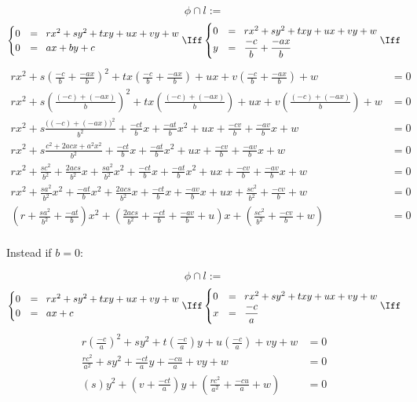 \documentclass[11pt,a4paper,english]{article}
\begin{document}
    \[
    \phi \cap l :=
    \]
    \[
    \begin{cases}
    	0 &=\;\; rx^{2} + sy^{2} + txy + ux + vy + w \\
		0 &=\;\; ax + by + c
    \end{cases} \Iff
    \begin{cases}
    	0 &=\;\; rx^{2} + sy^{2} + txy + ux + vy + w \\
		y &=\;\; \displaystyle\frac{-c}{b} + \displaystyle\frac{-ax}{b}
    \end{cases} \Iff
    \]
    \begin{align*}
    rx^{2} + s\left(\frac{-c}{b} + \frac{-ax}{b}\right)^{2} + tx\left(\frac{-c}{b} + \frac{-ax}{b}\right) + ux + v\left(\frac{-c}{b} + \frac{-ax}{b}\right) + w &= 0
    \\
	rx^{2} + s\left(\frac{(-c) + (-ax)}{b}\right)^{2} + tx\left(\frac{(-c) + (-ax)}{b}\right) + ux + v\left(\frac{(-c) + (-ax)}{b}\right) + w &= 0
	\\
	rx^{2} + s\frac{\big((-c) + (-ax)\big)^{2}}{b^{2}} + \frac{-ct}{b}x + \frac{-at}{b}x^{2} + ux + \frac{-cv}{b} + \frac{-av}{b}x + w &= 0
	\\
	rx^{2} + s\frac{c^{2} + 2acx + a^{2}x^{2}}{b^{2}} + \frac{-ct}{b}x + \frac{-at}{b}x^{2} + ux + \frac{-cv}{b} + \frac{-av}{b}x + w &= 0
	\\
	rx^{2} + \frac{sc^{2}}{b^{2}} + \frac{2acs}{b^{2}}x + \frac{sa^{2}}{b^{2}}x^{2} + \frac{-ct}{b}x + \frac{-at}{b}x^{2} + ux + \frac{-cv}{b} + \frac{-av}{b}x + w &= 0
	\\
	rx^{2} + \frac{sa^{2}}{b^{2}}x^{2} + \frac{-at}{b}x^{2} + \frac{2acs}{b^{2}}x + \frac{-ct}{b}x + \frac{-av}{b}x + ux + \frac{sc^{2}}{b^{2}} + \frac{-cv}{b} + w &= 0
	\\
	\left(r + \frac{sa^{2}}{b^{2}} + \frac{-at}{b}\right)x^{2} + \left(\frac{2acs}{b^{2}} + \frac{-ct}{b} + \frac{-av}{b} + u\right)x + \left(\frac{sc^{2}}{b^{2}} + \frac{-cv}{b} + w\right) &= 0
	\\
    \end{align*}
    
    \ppar
    Instead if \(b = 0\):
    
    \[
    \phi \cap l :=
    \]
    \[
    \begin{cases}
    	0 &=\;\; rx^{2} + sy^{2} + txy + ux + vy + w \\
		0 &=\;\; ax + c
    \end{cases} \Iff
    \begin{cases}
    	0 &=\;\; rx^{2} + sy^{2} + txy + ux + vy + w \\
		x &=\;\; \displaystyle\frac{-c}{a}
    \end{cases} \Iff
    \]
    \begin{align*}
    r\left(\frac{-c}{a}\right)^{2} + sy^{2} + t\left(\frac{-c}{a}\right)y + u\left(\frac{-c}{a}\right) + vy + w &= 0
    \\
    \frac{rc^{2}}{a^{2}} + sy^{2} + \frac{-ct}{a}y + \frac{-cu}{a} + vy + w &= 0
    \\
    \left(s\right)y^{2} + \left(v + \frac{-ct}{a}\right)y + \left(\frac{rc^{2}}{a^{2}} + \frac{-cu}{a} + w\right) &= 0
    \\
    \end{align*}
\end{document}
